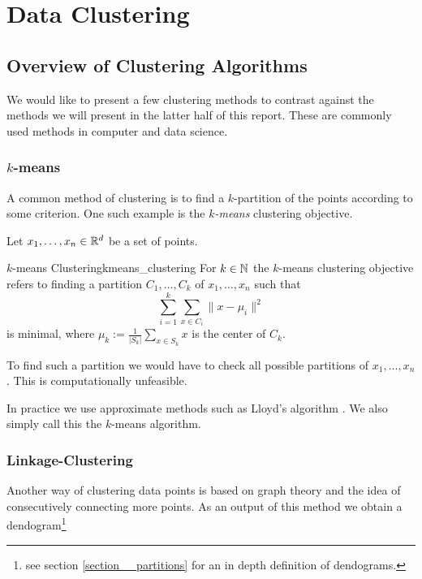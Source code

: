 \chapter{Data Clustering}

\section{Overview of Clustering Algorithms}
We would like to present a few clustering methods to contrast against the methods we will present in the latter half of this report. These are commonly used methods in computer and data science.

\subsection[$k$-means]{$k$-means \cite[Section~3.1]{Scitovski2021}}
A common method of clustering is to find a $k$-partition of the points according to some criterion.
One such example is the \emph{$k$-means} clustering objective.

Let $x_1, \dots, x_n \in \mathbb R^d$ be a set of points.

\begin{definition}{$k$-means Clustering}{kmeans_clustering}
For $k \in \mathbb N$ the $k$-means clustering objective refers to finding a partition $C_1, \dots, C_k$ of $x_1, \dots, x_n$ such that
\begin{equation*}
\label{eq:kmean_optimization}
    \sum_{i = 1}^k \sum_{x \in C_i} \|x - \mu_i\|^2
\end{equation*}
is minimal, where $\mu_k := \frac{1}{|S_k|}\sum_{x \in S_k} x$ is the center of $C_k$.
\end{definition}
To find such a partition we would have to check all possible partitions of $x_1, \dots, x_n$. This is computationally unfeasible.

In practice we use approximate methods such as Lloyd's algorithm \cite[Section~3.1.2]{Scitovski2021}. We also simply call this the $k$-means algorithm.

\subsection[Linkage-Clustering]{Linkage-Clustering \cite[Section~4.2.2]{Everitt2011}}
Another way of clustering data points is based on graph theory and the idea of consecutively connecting more points.
As an output of this method we obtain a dendogram\footnote{see section \ref{section__partitions} for an in depth definition of dendograms.}

